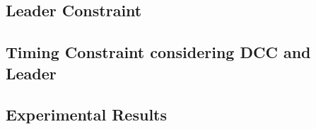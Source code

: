 \begin{comment}
Moreover, a \textit{technology leader} is inserted at the input of buffer 2. Here, \textit{technology leader} denotes that, the technology of downstream (toward terminals/flip-flops) clock buffers are replaced with new technology, such that the V\textsubscript{th} of the buffers are changed. Note that, the so-called downstream clock buffers are those between technology leader and terminals/flip-flops. For instance, when one technology leader is inserted at the input of buffer 2, the downstream buffers are those in the intervals from buffer 2 to \ce{FF_x} and  to \ce{FF_y}, which also include buffer 2 and buffer 3, but exclude flip-flops. Therefore, we can find that, for the clock buffers, which are in the intervals from buffer 2 to \ce{FF_x} and  to \ce{FF_y}, their technology is replaced with the new counterpart. Note that, in the example, we consider one type of new technology: HTV (High Threshold Voltage or High-V\textsubscript{th}) technology. Thus, the associated technology leader is named \textit{HTV leader}, which assigns high-V\textsubscript{th} to the downstream clock buffers. 
\end{comment}
\subsection{Leader Constraint}
\label{sec:TVA:leaderconstraint}

\subsection{Timing Constraint considering DCC and Leader}
\label{sec:TVA:timingconstraint}

\subsection{Experimental Results}
\label{sec:TVA:experiment}